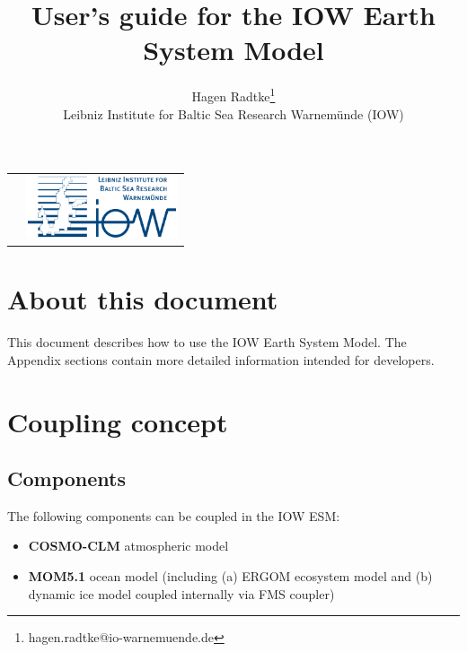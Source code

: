 \documentclass[a4paper,titlepage]{scrartcl}
\title{User's guide for the IOW Earth System Model}
\author{Hagen Radtke\thanks{hagen.radtke@io-warnemuende.de} \\ Leibniz Institute for Baltic Sea Research Warnem\"unde (IOW)}
\begin{document}
\sffamily
\setlength{\parskip}{0.5em}
\setlength{\parindent}{0.0em}

\begin{tabular}{>{\raggedright\arraybackslash}p{} >{\raggedleft\arraybackslash}p{}}
& \href{https://www.io-warnemuende.de}{\includegraphics[height=5em]{logo_iow_englisch_rgb.jpg}} 
\end{tabular}

\vspace*{5em}
{\let\newpage\relax\maketitle}

\section*{About this document}
This document describes how to use the IOW Earth System Model. The Appendix sections contain more detailed information intended for developers. 

\vfill 

\newpage

\renewcommand{\contentsname}{Table of Contents\\ \vspace{2cm}}
\tableofcontents

\newpage

\section{Coupling concept}

\subsection{Components}
The following components can be coupled in the IOW ESM:
\begin{itemize}
\item \textbf{COSMO-CLM} atmospheric model
\item \textbf{MOM5.1} ocean model (including (a) ERGOM ecosystem model and (b) dynamic ice model coupled internally via FMS coupler)
\end{itemize}
\end{document}
